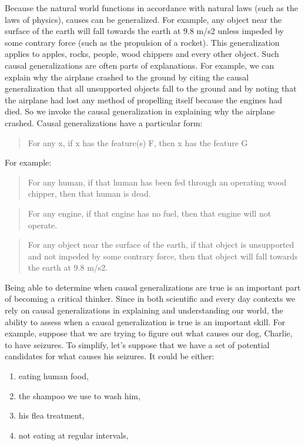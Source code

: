 Because the natural world functions in accordance with natural laws (such as the
laws of physics), causes can be generalized. For example, any object near the
surface of the earth will fall towards the earth at 9.8 m/s2 unless impeded by
some contrary force (such as the propulsion of a rocket). This generalization
applies to apples, rocks, people, wood chippers and every other object. Such
causal generalizations are often parts of explanations. For example, we can
explain why the airplane crashed to the ground by citing the causal
generalization that all unsupported objects fall to the ground and by noting that
the airplane had lost any method of propelling itself because the engines had
died. So we invoke the causal generalization in explaining why the airplane
crashed. Causal generalizations have a particular form:

\begin{quote}
For any x, if x has the feature(s) F, then x has the feature G
\end{quote}

For example:

\begin{quote}
For any human, if that human has been fed through an operating wood
chipper, then that human is dead.
\end{quote}

\begin{quote}
For any engine, if that engine has no fuel, then that engine will
not operate.
\end{quote}

\begin{quote}
For any object near the surface of the earth, if that object is unsupported
and not impeded by some contrary force, then that object will fall
towards the earth at 9.8 m/s2.
\end{quote}

Being able to determine when causal generalizations are true is an important
part of becoming a critical thinker. Since in both scientific and every day
contexts we rely on causal generalizations in explaining and understanding our
world, the ability to assess when a causal generalization is true is an important
skill. For example, suppose that we are trying to figure out what causes our
dog, Charlie, to have seizures. To simplify, let's suppose that we have a set of
potential candidates for what causes his seizures. It could be either:

\begin{enumerate}
\item eating human food,
\item the shampoo we use to wash him,
\item his flea treatment,
\item not eating at regular intervals,
\end{enumerate}

